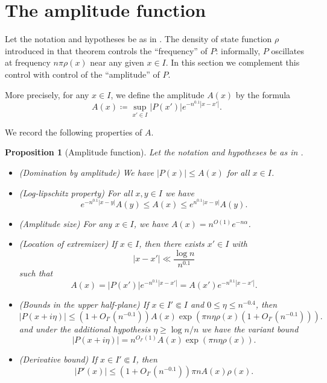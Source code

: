 \documentclass[12pt]{amsart}
\newtheorem{proposition}[theorem]{Proposition}
\begin{document}
\section{The amplitude function}\label{grid-sec}

Let the notation and hypotheses be as in .  The density of state function $\rho$ introduced in that theorem controls the ``frequency'' of $P$: informally, $P$ oscillates at frequency $n \pi \rho(x)$ near any given $x \in I$.  In this section we complement this control with control of the ``amplitude'' of $P$.

More precisely, for any $x \in I$, we define the amplitude $A(x)$ by the formula
\begin{equation}\label{eqx}
A(x) \coloneqq \sup_{x' \in I} |P(x')| e^{-n^{0.1}|x-x'|}.
\end{equation}

We record the following properties of $A$.

\begin{proposition}[Amplitude function]\label{good-grid}  Let the notation and hypotheses be as in .
\begin{itemize}
\item[(i)] (Domination by amplitude) We have $|P(x)| \leq A(x)$ for all $x \in I$.
\item[(ii)] (Log-lipschitz property)  For all $x,y \in I$ we have
$$ e^{-n^{0.1}|x-y|} A(y) \leq A(x) \leq e^{n^{0.1}|x-y|}A(y).$$
\item[(iii)]  (Amplitude size)  For any $x \in I$, we have $A(x) = n^{O(1)} e^{-n\alpha}$.
\item[(iv)]  (Location of extremizer) If $x \in I$, then there exists $x' \in I$ with
\begin{equation}\label{xxn}
    |x-x'| \ll \frac{\log n}{n^{0.1}}
\end{equation}
 such that
\begin{equation}\label{axi}
A(x) = |P(x')| e^{-n^{0.1}|x-x'|} = A(x') e^{-n^{0.1}|x-x'|}.
\end{equation}
\item[(v)]  (Bounds in the upper half-plane) If $x \in I' \Subset I$ and $0 \leq \eta \leq n^{-0.4}$, then
\begin{equation}\label{bound-1}
 |P(x+i\eta)| \leq (1 + O_{I'}(n^{-0.1})) A(x) \exp( \pi n \eta \rho(x) (1 + O_{I'}(n^{-0.1}))).
\end{equation}
and under the additional hypothesis $\eta \geq \log n / n$ we have the variant bound
\begin{equation}\label{bound-2}
|P(x+i\eta)| = n^{O_{I'}(1)} A(x) \exp( \pi n \eta \rho(x) ).
\end{equation}
\item[(vi)]  (Derivative bound) If $x \in I' \Subset I$, then
\begin{equation}\label{pderiv}
 |P'(x)| \leq  (1 + O_{I'}(n^{-0.1})) \pi n A(x) \rho(x).
\end{equation}
\end{itemize}

\end{proposition}
\end{document}
